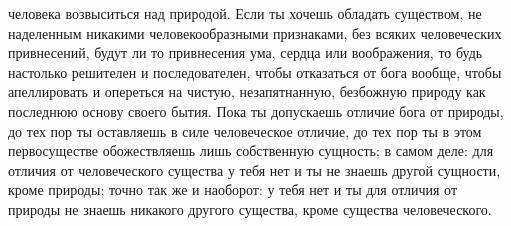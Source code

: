 \documentclass[12pt]{article}
\begin{document}
человека возвыситься над природой. Если ты хочешь обладать существом, не наделенным никакими человекообразными признаками, без всяких человеческих привнесений, будут ли то привнесения ума, сердца или воображения, то будь настолько решителен и последователен, чтобы отказаться от бога вообще, чтобы апеллировать и опереться на чистую, незапятнанную, безбожную природу как последнюю основу своего бытия. Пока ты допускаешь отличие бога от природы, до тех пор ты оставляешь в силе человеческое отличие, до тех пор ты в этом первосуществе обожествляешь лишь собственную сущность; в самом деле: для отличия от человеческого существа у тебя нет и ты не знаешь другой сущности, кроме природы; точно так же и наоборот: у тебя нет и ты для отличия от природы не знаешь никакого другого существа, кроме существа человеческого.

\section{}
\end{document}
